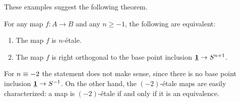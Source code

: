 \documentclass[9pt,twosided]{amsart}
\begin{document}
These examples suggest the following theorem.

\begin{thm}
  \label{thm:char_n_etale}
  For any map $f:A\to B$ and any $n\geq -1$, the following are equivalent:
  \begin{enumerate}
  \item The map $f$ is $n$-\'etale.
  \item The map $f$ is right orthogonal to the base point inclusion $\underline{\mathbf{1}}\to S^{n+1}$.
  \end{enumerate}
\end{thm}

\begin{rmk}
  For $n\equiv -2$ the statement does not make sense, since there is no base point inclusion $\underline{\mathbf{1}}\to S^{-1}$. On the other hand, the $(-2)$-\'etale maps are easily characterized: a map is $(-2)$-\'etale if and only if it is an equivalence.
\end{rmk}
\end{document}
